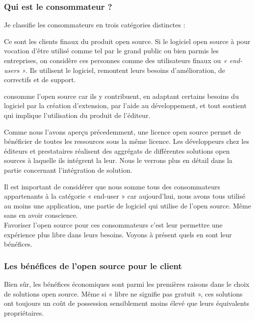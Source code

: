 			\subsubsection{Qui est le consommateur ?}

			Je classifie les consommateurs en trois catégories distinctes :
			\begin{description}[font=\color{burntorange}]
				\item[Les end-users:] Ce sont les clients finaux du produit open source. Si le logiciel open source à pour vocation d'être utilisé comme tel par le grand public ou bien parmis les entreprises, on considère ces personnes comme des utilisateurs finaux ou \textit{« end-users »}. Ils utilisent le logiciel, remontent leurs besoins d'amélioration, de correctifs et de support.
				\item[Les contributeurs et la communauté:] consomme l'open source car ils y contribuent, en adaptant certains besoins du logiciel par la création d'extension, par l'aide au développement, et tout soutient qui implique l'utilisation du produit de l'éditeur.
				\item[Les autres éditeurs et prestataires:] Comme nous l'avons aperçu précedemment, une licence open source permet de bénéficier de toutes les ressources sous la même licence. Les développeurs chez les éditeurs et prestataires réalisent des aggrégats de différentes solutions open sources à laquelle ils intégrent la leur. Nous le verrons plus en détail dans la partie concernant l'intégration de solution.
			\end{description}

			Il est important de considérer que nous somme tous des consommateurs appartenants à la catégorie « end-user » car aujourd'hui, nous avons tous utilisé au moins une application, une partie de logiciel qui utilise de l'open source. Même sans en avoir conscience.\\

			Favoriser l'open source pour ces consommateurs c'est leur permettre une expérience plus libre dans leurs besoins. Voyons à présent quels en sont leur bénéfices.
			
			\subsubsection{Les bénéfices de l'open source pour le client}

			Bien sûr, les bénéfices économiques sont parmi les premières raisons dans le choix de solutions open source. Même si « libre ne signifie pas gratuit », ces solutions ont toujours un coût de possession sensiblement moins élevé que leurs équivalents propriétaires.\\

